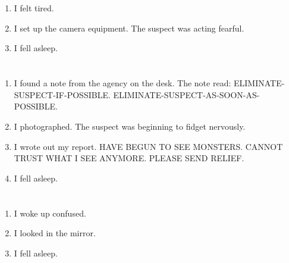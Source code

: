 \documentclass{article}
\begin{document}
    \section{}
    
    \begin{enumerate}
    
    \item I felt tired.\\
    
    \item I set up the camera equipment. The suspect was acting fearful.\\
    
    \item I fell asleep.\\
    
    \end{enumerate}
     
    \newpage
    
    \section{}
    
    \begin{enumerate}
    
    \item I found a note from the agency on the desk. The note read: ELIMINATE-SUSPECT-IF-POSSIBLE. ELIMINATE-SUSPECT-AS-SOON-AS-POSSIBLE.\\
    
    \item I photographed. The suspect was beginning to fidget nervously.\\
    
    \item I wrote out my report. HAVE BEGUN TO SEE MONSTERS. CANNOT TRUST WHAT I SEE ANYMORE. PLEASE SEND RELIEF.\\
    
    \item I fell asleep.\\
    
    \end{enumerate}
     
    \newpage
    
    \section{}
    
    \begin{enumerate}
    
    \item I woke up confused.\\
    
    \item I looked in the mirror.\\
    
    \item I fell asleep.\\
    
    \end{enumerate}
     
\end{document}
